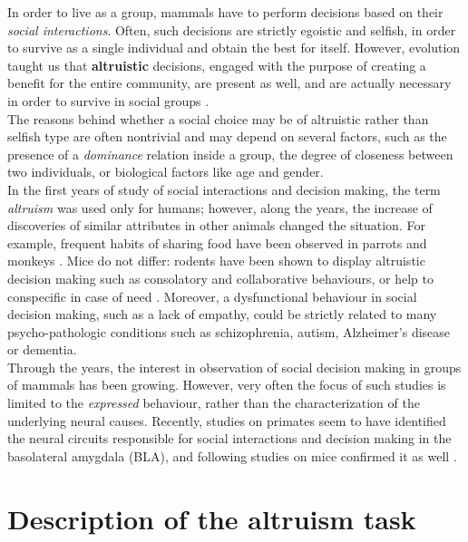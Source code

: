 \documentclass[12pt, a4paper]{report}
\begin{document}
In order to live as a group, mammals have to perform decisions based on their \textit{social interactions}. Often, such decisions are strictly egoistic and selfish, in order to survive as a single individual and obtain the best for itself. However, evolution taught us that \textbf{altruistic} decisions, engaged with the purpose of creating a benefit for the entire community, are present as well, and are actually necessary in order to survive in social groups \cite{25}. \\%
The reasons behind whether a social choice may be of altruistic rather than selfish type are often nontrivial and may depend on several factors, such as the presence of a \textit{dominance} relation inside a group, the degree of closeness between two individuals, or biological factors like age and gender.\\
In the first years of study of social interactions and decision making, the term \textit{altruism} was used only for humans; however, along the years, the increase of discoveries of similar attributes in other animals changed the situation. For example, frequent habits of sharing food have been observed in parrots \cite{26} %
 and monkeys \cite{27}. %
 Mice do not differ: rodents have been shown to display altruistic decision making such as consolatory and collaborative behaviours, or help to conspecific in case of need \cite{28}. %
Moreover, a dysfunctional behaviour in social decision making, such as a lack of empathy, could be strictly related to many psycho-pathologic conditions such as schizophrenia, autism, Alzheimer's disease or dementia. \\
Through the years, the interest in observation of social decision making in groups of mammals has been growing. However, very often the focus of such studies is limited to the \textit{expressed} behaviour, rather than the characterization of the underlying neural causes. Recently, studies on primates \cite{29} %
 seem to have identified the neural circuits responsible for social interactions and decision making in the basolateral amygdala (BLA), and following studies on mice confirmed it as well \cite{30}.%

\section{Description of the altruism task}
\end{document}
